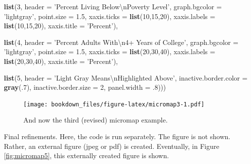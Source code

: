 \documentclass[
]{krantz}
\makeatletter
\newenvironment{Shaded}{\begin{snugshade}}{\end{snugshade}}
\newcommand{\CharTok}[1]{\textcolor[rgb]{0.5,0.5,0.5}{#1}}
\newcommand{\DataTypeTok}[1]{\textcolor[rgb]{0.27,0.27,0.27}{#1}}
\newcommand{\DecValTok}[1]{\textcolor[rgb]{0.06,0.06,0.06}{#1}}
\newcommand{\FloatTok}[1]{\textcolor[rgb]{0.06,0.06,0.06}{#1}}
\newcommand{\KeywordTok}[1]{\textcolor[rgb]{0.27,0.27,0.27}{\textbf{#1}}}
\newcommand{\NormalTok}[1]{#1}
\newcommand{\StringTok}[1]{\textcolor[rgb]{0.5,0.5,0.5}{#1}}
\newenvironment{kframe}{%
\medskip{}
\setlength{\fboxsep}{.8em}
 \def\at@end@of@kframe{}%
 \ifinner\ifhmode%
  \def\at@end@of@kframe{\end{minipage}}%
  \begin{minipage}{\columnwidth}%
 \fi\fi%
 \def\FrameCommand##1{\hskip\@totalleftmargin \hskip-\fboxsep
 \colorbox{shadecolor}{##1}\hskip-\fboxsep
     \hskip-\linewidth \hskip-\@totalleftmargin \hskip\columnwidth}%
 \MakeFramed {\advance\hsize-\width
   \@totalleftmargin\z@ \linewidth\hsize
   \@setminipage}}%
 {\par\unskip\endMakeFramed%
 \at@end@of@kframe}
\renewenvironment{Shaded}{\begin{kframe}}{\end{kframe}}
\makeatother
\begin{document}
\begin{Shaded}
\begin{Highlighting}[]
                \KeywordTok{list}\NormalTok{(}\DecValTok{3}\NormalTok{, }\DataTypeTok{header =} \StringTok{'Percent Living Below}\CharTok{\textbackslash{}n}\StringTok{Poverty Level'}\NormalTok{,}
                    \DataTypeTok{graph.bgcolor =} \StringTok{'lightgray'}\NormalTok{, }\DataTypeTok{point.size =} \FloatTok{1.5}\NormalTok{,}
                    \DataTypeTok{xaxis.ticks =} \KeywordTok{list}\NormalTok{(}\DecValTok{10}\NormalTok{,}\DecValTok{15}\NormalTok{,}\DecValTok{20}\NormalTok{), }
                    \DataTypeTok{xaxis.labels =} \KeywordTok{list}\NormalTok{(}\DecValTok{10}\NormalTok{,}\DecValTok{15}\NormalTok{,}\DecValTok{20}\NormalTok{),}
                    \DataTypeTok{xaxis.title =} \StringTok{'Percent'}\NormalTok{),}

                \KeywordTok{list}\NormalTok{(}\DecValTok{4}\NormalTok{, }\DataTypeTok{header =} \StringTok{'Percent Adults With}\CharTok{\textbackslash{}n}\StringTok{4+ Years of College'}\NormalTok{,}
                    \DataTypeTok{graph.bgcolor =} \StringTok{'lightgray'}\NormalTok{, }\DataTypeTok{point.size =} \FloatTok{1.5}\NormalTok{,}
                    \DataTypeTok{xaxis.ticks =} \KeywordTok{list}\NormalTok{(}\DecValTok{20}\NormalTok{,}\DecValTok{30}\NormalTok{,}\DecValTok{40}\NormalTok{), }
                    \DataTypeTok{xaxis.labels =} \KeywordTok{list}\NormalTok{(}\DecValTok{20}\NormalTok{,}\DecValTok{30}\NormalTok{,}\DecValTok{40}\NormalTok{), }
                    \DataTypeTok{xaxis.title =} \StringTok{'Percent'}\NormalTok{),}
    
                \KeywordTok{list}\NormalTok{(}\DecValTok{5}\NormalTok{, }\DataTypeTok{header =} \StringTok{'Light Gray Means}\CharTok{\textbackslash{}n}\StringTok{Highlighted Above'}\NormalTok{, }
                    \DataTypeTok{inactive.border.color =} \KeywordTok{gray}\NormalTok{(.}\DecValTok{7}\NormalTok{), }\DataTypeTok{inactive.border.size =} \DecValTok{2}\NormalTok{, }
                    \DataTypeTok{panel.width =} \FloatTok{.8}\NormalTok{)))}
\end{Highlighting}
\end{Shaded}

\begin{figure}
\centering
\texttt{[image: bookdown\_files/figure-latex/micromap3-1.pdf]}
\caption{\label{fig:micromap3}And now the third (revised) micromap example.}
\end{figure}

Final refinements. Here, the code is run separately. The figure is not shown.
Rather, an external figure (jpeg or pdf) is created. Eventually,
in Figure \ref{fig:micromap5}, this externally created figure is shown.
\end{document}
